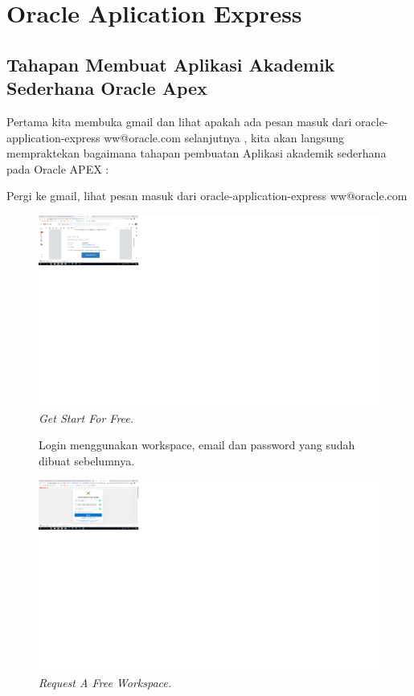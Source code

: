 \chapter{Oracle Aplication Express}

\section{Tahapan Membuat Aplikasi Akademik Sederhana Oracle Apex}
Pertama kita membuka gmail dan lihat apakah ada pesan masuk dari oracle-application-express ww@oracle.com selanjutnya , kita akan langsung mempraktekan bagaimana tahapan pembuatan Aplikasi akademik sederhana pada Oracle APEX :

\begin{enumerate}
\item[1] Pergi ke gmail, lihat pesan masuk dari oracle-application-express ww@oracle.com

\begin{figure}[!htbp]
    \begin{center}
    \includegraphics[scale=0.5]{figures/0.png}
    \caption{\textit{Get Start For Free.}}
    \end{center}   
    \end{figure}
    
\begin{figure}[!htbp]
\item[2]Login menggunakan workspace, email dan password yang sudah dibuat sebelumnya.

    \begin{center}
    \includegraphics[scale=0.5]{figures/1.png}
    \caption{\textit{Request A Free Workspace.}}
    \end{center}
    \end{figure}
    

\end{enumerate}
